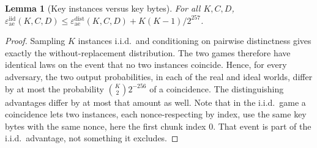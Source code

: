 \documentclass[pdflatex,sn-mathphys-num]{sn-jnl}
\theoremstyle{plain}
\newtheorem{lemma}[theorem]{Lemma}
\theoremstyle{definition}
\begin{document}
\begin{lemma}[Key instances versus key bytes]\label{lem:keycoll}
For all $K,C,D$, $\varepsilon^{\mathrm{iid}}_{\mathrm{ae}}(K,C,D)\le\varepsilon^{\mathrm{dist}}_{\mathrm{ae}}(K,C,D)+K(K-1)/2^{257}$.
\end{lemma}
\begin{proof}
Sampling $K$ instances i.i.d.\ and conditioning on pairwise distinctness gives exactly the without-replacement distribution. The two games therefore have identical laws on the event that no two instances coincide. Hence, for every adversary, the two output probabilities, in each of the real and ideal worlds, differ by at most the probability $\binom K22^{-256}$ of a coincidence. The distinguishing advantages differ by at most that amount as well. Note that in the i.i.d.\ game a coincidence lets two instances, each nonce-respecting by index, use the same key bytes with the same nonce, here the first chunk index $0$. That event is part of the i.i.d.\ advantage, not something it excludes.
\end{proof}
\end{document}
